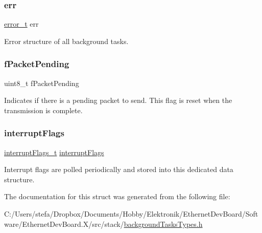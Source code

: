 \subsubsection{\texorpdfstring{err}{err}}
{\footnotesize\ttfamily \mbox{\hyperlink{group__error_gad3ae44be85fe6952dcaed425499e8f6b}{error\+\_\+t}} err}



Error structure of all background tasks. 

\mbox{\label{structbackground_task_handler_a55a5ad03a1e3f5808b419c49021b4759}} 
\subsubsection{\texorpdfstring{fPacketPending}{fPacketPending}}
{\footnotesize\ttfamily uint8\+\_\+t f\+Packet\+Pending}



Indicates if there is a pending packet to send. This flag is reset when the transmission is complete. 

\mbox{\label{structbackground_task_handler_a58c597d1c6de0f01d960436216389529}} 
\subsubsection{\texorpdfstring{interruptFlags}{interruptFlags}}
{\footnotesize\ttfamily \mbox{\hyperlink{group__interrupts_ga337298055be267e726930c9fc6b2d4eb}{interrupt\+Flags\+\_\+t}} \mbox{\hyperlink{structinterrupt_flags}{interrupt\+Flags}}}



Interrupt flags are polled periodically and stored into this dedicated data structure. 



The documentation for this struct was generated from the following file\+:\begin{DoxyCompactItemize}
\item 
C\+:/\+Users/stefa/\+Dropbox/\+Documents/\+Hobby/\+Elektronik/\+Ethernet\+Dev\+Board/\+Software/\+Ethernet\+Dev\+Board.\+X/src/stack/\mbox{\hyperlink{background_tasks_types_8h}{background\+Tasks\+Types.\+h}}\end{DoxyCompactItemize}
